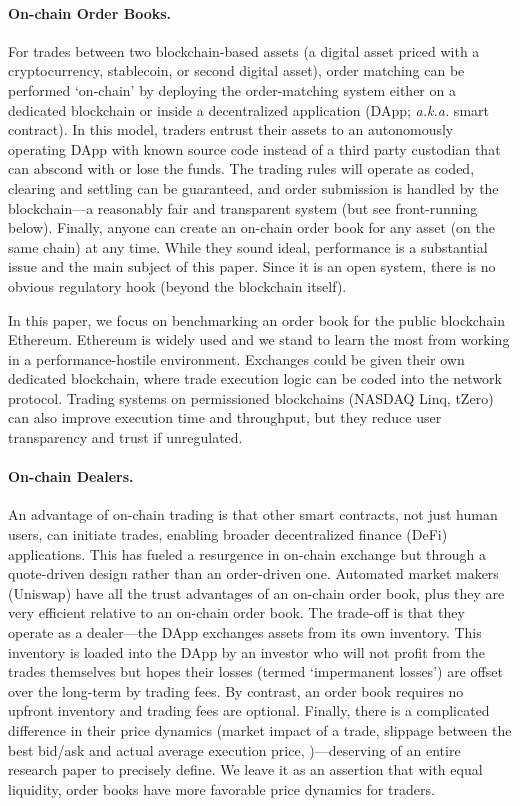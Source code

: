 \paragraph{On-chain Order Books.} For trades between two blockchain-based assets (\eg a digital asset priced with a cryptocurrency, stablecoin, or second digital asset), order matching can be performed `on-chain' by deploying the order-matching system either on a dedicated blockchain or inside a decentralized application (DApp; \textit{a.k.a.} smart contract). In this model, traders entrust their assets to an autonomously operating DApp with known source code instead of a third party custodian that can abscond with or lose the funds. The trading rules will operate as coded, clearing and settling can be guaranteed, and order submission is handled by the blockchain---a reasonably fair and transparent system (but see front-running below). Finally, anyone can create an on-chain order book for any asset (on the same chain) at any time. While they sound ideal, performance is a substantial issue and the main subject of this paper. Since it is an open system, there is no obvious regulatory hook (beyond the blockchain itself). 

In this paper, we focus on benchmarking an order book for the public blockchain Ethereum. Ethereum is widely used and we stand to learn the most from working in a performance-hostile environment. Exchanges could be given their own dedicated blockchain, where trade execution logic can be coded into the network protocol. Trading systems on permissioned blockchains (\eg NASDAQ Linq, tZero) can also improve execution time and throughput, but they reduce user transparency and trust if unregulated.

\paragraph{On-chain Dealers.} An advantage of on-chain trading is that other smart contracts, not just human users, can initiate trades, enabling broader decentralized finance (DeFi) applications. This has fueled a resurgence in on-chain exchange but through a quote-driven design rather than an order-driven one. Automated market makers  (\eg Uniswap) have all the trust advantages of an on-chain order book, plus they are very efficient relative to an on-chain order book. The trade-off is that they operate as a dealer---the DApp exchanges assets from its own inventory. This inventory is loaded into the DApp by an investor who will not profit from the trades themselves but hopes their losses (termed `impermanent losses') are offset over the long-term by trading fees. By contrast, an order book requires no upfront inventory and trading fees are optional. Finally, there is a complicated difference in their price dynamics (\eg market impact of a trade, slippage between the best bid/ask and actual average execution price, \etc)---deserving of an entire research paper to precisely define. We leave it as an assertion that with equal liquidity, order books have more favorable price dynamics for traders.

